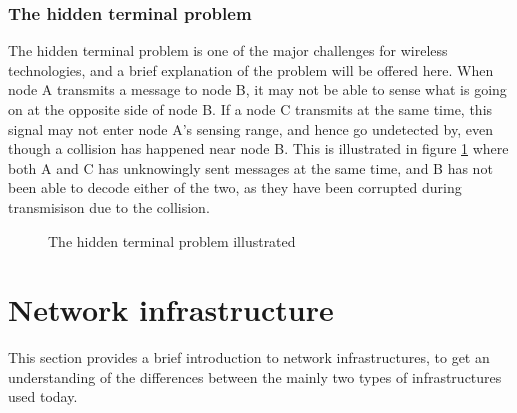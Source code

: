      \subsubsection{The hidden terminal problem}
     The hidden terminal problem is one of the major challenges for wireless technologies, and a brief explanation of the problem will be offered here.
		 When node A transmits a message to node B, it may not be able to sense what is going on
     at the opposite side of node B. If a node C transmits at the same time, this signal may not enter node A's sensing range, and
     hence go undetected by, even though a collision has happened near node B. This is illustrated in figure \ref{fig:hiddenterminal} where
     both A and C has unknowingly sent messages at the same time, and B has not been able to decode either of the two, as they have been corrupted during
		 transmisison due to the collision. 

     \begin{figure}
     \center

     \caption{The hidden terminal problem illustrated}
     \label{fig:hiddenterminal}
     \end{figure}


\section{Network infrastructure}
		This section provides a brief introduction to network infrastructures, to get an understanding of the differences between the mainly two types of infrastructures used today. 
